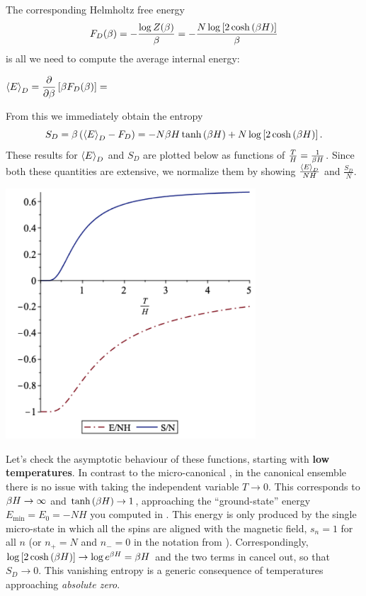 The corresponding Helmholtz free energy
\begin{equation}
  \label{eq:dist_Helm}
  F_D(\beta) = -\frac{\log Z(\beta)}{\beta} = -\frac{N \log\left[2\cosh\left(\beta H\right)\right]}{\beta}
\end{equation}
is all we need to compute the average internal energy:
\begin{mdframed}
  $\displaystyle \left\langle E \right\rangle_D = \frac{\partial }{\partial \beta}\left[\beta F_D(\beta)\right] = $ \\[100 pt]
\end{mdframed}
From this we immediately obtain the entropy
\begin{equation}
  \label{eq:dist_entropy}
  S_D = \beta\left(\left\langle E \right\rangle_D - F_D\right) = -N\beta H \tanh\left(\beta H\right) + N \log\left[2\cosh\left(\beta H\right)\right].
\end{equation}
These results for $\left\langle E \right\rangle_D$ and $S_D$ are plotted below as functions of $\frac{T}{H} = \frac{1}{\beta H}$.
Since both these quantities are extensive, we normalize them by showing $\frac{\left\langle E \right\rangle_D}{NH}$ and $\frac{S_D}{N}$.

\begin{center}
  \includegraphics[width=0.7\textwidth]{figs/unit03_distinguish.pdf}
\end{center}

Let's check the asymptotic behaviour of these functions, starting with \textbf{low temperatures}.
In contrast to the micro-canonical , in the canonical ensemble there is no issue with taking the independent variable $T \to 0$.
This corresponds to $\beta H \to \infty$ and $\tanh\left(\beta H\right) \to 1$, approaching the ``ground-state'' energy $E_{\text{min}} = E_0 = -NH$ you computed in .
This energy is only produced by the single micro-state in which all the spins are aligned with the magnetic field, $s_n = 1$ for all $n$ (or $n_+ = N$ and $n_- = 0$ in the notation from ).
Correspondingly, $\log\left[2\cosh\left(\beta H\right)\right] \to \log e^{\beta H} = \beta H$ and the two terms in  cancel out, so that $S_D \to 0$.
This vanishing entropy is a generic consequence of temperatures approaching \textit{absolute zero}.

